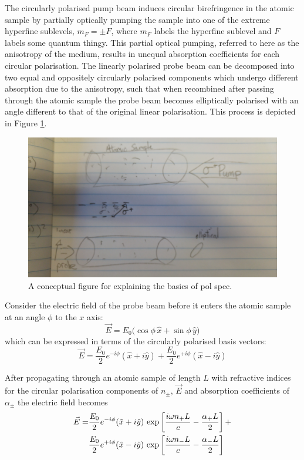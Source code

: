 The circularly polarised pump beam induces circular birefringence in the atomic sample by partially optically pumping the sample into one of the extreme hyperfine sublevels, $m_F=\pm F$, where $m_F$ labels the hyperfine sublevel and $F$ labels {\color{red}some quantum thingy.}
This partial optical pumping, referred to here as the anisotropy of the medium, results in unequal absorption coefficients for each circular polarisation.
The linearly polarised probe beam can be decomposed into two equal and oppositely circularly polarised components which undergo different absorption due to the anisotropy, such that when recombined after passing through the atomic sample the probe beam becomes elliptically polarised with an angle different to that of the original linear polarisation.
This process is depicted in Figure \ref{figure:pol_spec_explanation}.

\begin{figure}
\centering
\includegraphics[width=\linewidth,angle=180]{part1/Figs/pol_spec_explanation_placeholder.jpg}
\caption{A conceptual figure for explaining the basics of pol spec.}
\label{figure:pol_spec_explanation}
\end{figure}

Consider the electric field of the probe beam before it enters the atomic sample at an angle $\phi$ to the $x$ axis:
\begin{equation}
\vec{E}=E_0\big(\cos{\phi}\,\hat{x}+\sin{\phi}\,\hat{y}\big)
\end{equation}
which can be expressed in terms of the circularly polarised basis vectors:
\begin{equation}
\vec{E} = \frac{E_0}{2}e^{-i\phi}(\hat{x}+i\hat{y}) + \frac{E_0}{2}e^{+i\phi}(\hat{x}-i\hat{y})
\end{equation}

After propagating through an atomic sample of length $L$ with refractive indices for the circular polarisation components of $n_\pm$, $\vec{E}$ and absorption coefficients of $\alpha_\pm$ the electric field becomes
\begin{align}
\vec{E} = &\frac{E_0}{2}e^{-i\phi}(\hat{x}+i\hat{y})\,\exp\left[\frac{i\omega n_+ L}{c} - \frac{\alpha_+ L}{2}\right] +\notag\\
&\frac{E_0}{2}e^{+i\phi}(\hat{x}-i\hat{y})\,\exp\left[\frac{i\omega n_- L}{c} - \frac{\alpha_- L}{2}\right]\label{equation:elliptically_polarised}
\end{align}

